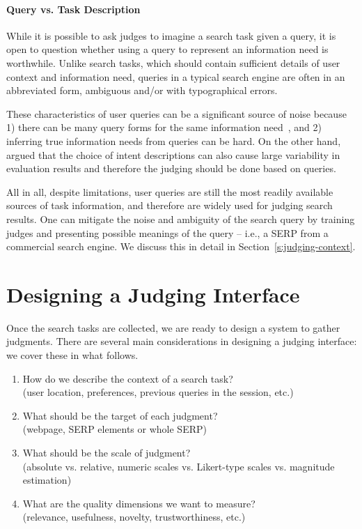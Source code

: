 
\paragraph{Query vs. Task Description} While it is possible to ask judges to imagine a search task given a query, it is open to question whether using a query to represent an information need is worthwhile. Unlike search tasks, which should contain sufficient details of user context and information need, queries in a typical search engine are often in an abbreviated form, ambiguous and/or with typographical errors. 

These characteristics of user queries can be a significant source of noise because 1) there can be many query forms for the same information need~\citep{Bailey:2015:UVI}, and 2) inferring true information needs from queries can be hard. On the other hand, \cite{Yilmaz:2014:EID} argued that the choice of intent descriptions can also cause large variability in evaluation results and therefore the judging should be done based on queries.

All in all, despite limitations, user queries are still the most readily available sources of task information, and therefore are widely used for judging search results. One can mitigate the noise and ambiguity of the search query by training judges and presenting possible meanings of the query -- i.e., a SERP from a commercial search engine. We discuss this in detail in Section~\ref{s:judging-context}.

\section{Designing a Judging Interface}

Once the search tasks are collected, we are ready to design a system to gather judgments. There are several main considerations in designing a judging interface: we cover these in what follows.

\begin{enumerate}
	\item  How do we describe the context of a search task? \\(user location, preferences, previous queries in the session, etc.)
	\item  What should be the target of each judgment? \\(webpage, SERP elements or whole SERP)
	\item  What should be the scale of judgment? \\(absolute vs. relative, numeric scales vs. Likert-type scales vs. magnitude estimation)	
	\item  What are the quality dimensions we want to measure? \\(relevance, usefulness, novelty, trustworthiness, etc.)
\end{enumerate}

